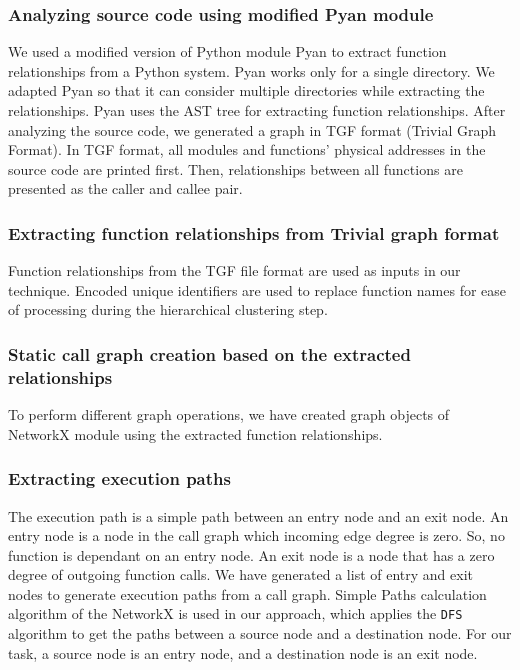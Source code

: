 \subsubsection{Analyzing source code using modified Pyan module}

We used a modified version of Python module Pyan \cite{pyan} to extract function relationships from a Python system. Pyan works only for a single directory. We adapted Pyan so that it can consider multiple directories while extracting the relationships. Pyan uses the AST tree for extracting function relationships. After analyzing the source code, we generated a graph in TGF format (Trivial Graph Format). In TGF format, all modules and functions' physical addresses in the source code are printed first. Then, relationships between all functions are presented as the caller and callee pair.

\subsubsection{Extracting function relationships from Trivial graph format}

Function relationships from the TGF file format are used as inputs in our technique. Encoded unique identifiers are used to replace function names for ease of processing during the hierarchical clustering step.

\subsubsection{Static call graph creation based on the extracted relationships}
To perform different graph operations, we have created graph objects of NetworkX \cite{networkx} module using the extracted function relationships. 
\subsubsection{Extracting execution paths}

The execution path is a simple path between an entry node and an exit node. An entry node is a node in the call graph which incoming edge degree is zero. So, no function is dependant on an entry node. An exit node is a node that has a zero degree of outgoing function calls. We have generated a list of entry and exit nodes to generate execution paths from a call graph. Simple Paths calculation algorithm of the NetworkX \cite{networkx}  is used in our approach, which applies the \texttt{DFS} algorithm to get the paths between a source node and a destination node. For our task, a source node is an entry node, and a destination node is an exit node.    


